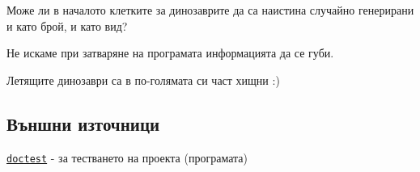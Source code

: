 \begin{DoxyItemize}
\item Може ли в началото клетките за динозаврите да са наистина случайно генерирани и като брой, и като вид?
\item Не искаме при затваряне на програмата информацията да се губи.
\item Летящите динозаври са в по-\/голямата си част хищни \+:)
\end{DoxyItemize}

\subsection*{}

\subsection*{Външни източници}


\begin{DoxyItemize}
\item \href{https://github.com/onqtam/doctest}{\tt doctest} -\/ за тестването на проекта (програмата) 
\end{DoxyItemize}